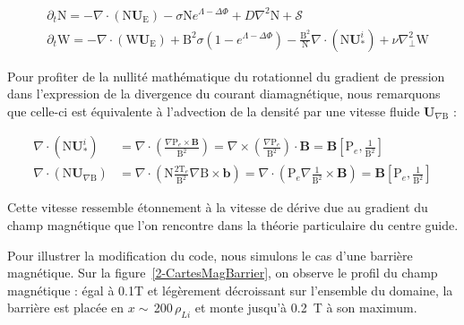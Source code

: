 \begin{refsection}
\begin{align}
\label{2-eqContinuiteMag}
&\partial_t \text{N}
= - \nabla\cdot\left(\text{N}\mathbf U_\text{E}\right) -\sigma
\text{N}e^{\Lambda-\Delta\Phi} + D\nabla^2 \text{N} + \mathcal{S}
\\
\label{2-eqCourantMag}
&\partial_{t}\text{W} = 
-\nabla\cdot\left(\text{W}\mathbf U_\text{E}\right)
+\text{B}^2\sigma\left(1-e^{\Lambda-\Delta\Phi}\right) 
-\frac{\text{B}^2}{\text{N}}\nabla\cdot\left(\text{N}\mathbf U^i_*\right) 
+\nu\nabla_\perp^2\text{W}
\end{align}

Pour profiter de la nullité mathématique du rotationnel du gradient de
pression dans l'expression de la divergence du courant
diamagnétique, nous remarquons que celle-ci est équivalente à l'advection de la
densité par une vitesse fluide $\mathbf U_{\nabla\text{B}}$ :

\begin{align}
\nabla\cdot\left(\text{N}\mathbf U^i_{*}\right)&=
\nabla\cdot\left(\frac{\nabla\text{P}_e\times\mathbf
B}{\text{B}^2}\right)=
\nabla\times\left(\frac{\nabla\text{P}_e}{\text{B}^2}\right)\cdot
\mathbf B=\mathbf B\left[\text{P}_e,\frac{1}{\text{B}^2}\right]\\
\nabla\cdot\left(\text{N}\mathbf U_{\nabla\text{B}}\right)&=
\nabla\cdot\left(\text{N}\frac{2\text{T}_e}{\text{B}^2}\nabla\text{B}\times\mathbf
b\right)=
\nabla\cdot\left(\text{P}_e\nabla\frac{1}{\text{B}^2}\times\mathbf
B\right)=\mathbf B\left[\text{P}_e,\frac{1}{\text{B}^2}\right]
\end{align}

Cette vitesse ressemble étonnement à la vitesse de dérive due au gradient du
champ magnétique que l'on rencontre dans la théorie particulaire du centre
guide. 

Pour illustrer la modification du code, nous simulons le cas d'une
barrière magnétique. Sur la
figure~\ref{2-CartesMagBarrier}, on observe le profil du champ magnétique : égal
à 0.1T et légèrement décroissant sur l'ensemble du domaine, la barrière est
placée en $x\sim\,$200$\,\rho_{Li}$ et monte jusqu'à 0.2~T à son maximum.


\end{refsection}

